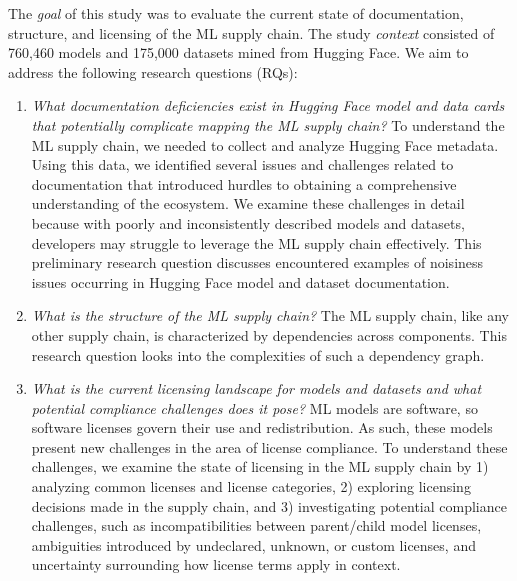 \label{sec:methodology}

The \emph{goal} of this study was to evaluate the current state of documentation, structure, and licensing of the ML supply chain. The study \emph{context} consisted of 760,460 models and 175,000 datasets mined from Hugging Face. We aim to address the following research questions (RQs):

\begin{enumerate}[label=\textbf{RQ$_\arabic*$:}, ref=\textbf{RQ$_\arabic*$}, wide, labelindent=10pt,leftmargin=10pt, start=0]\setlength{\itemsep}{0.2em} 

    \item \label{rq:2}{\textit{What documentation deficiencies exist in Hugging Face model and data cards that potentially complicate mapping the ML supply chain?}} %
    To understand the ML supply chain, we needed to collect and analyze Hugging Face metadata. Using this data, we identified several issues and challenges related to documentation that introduced hurdles to obtaining a comprehensive understanding of the ecosystem. We examine these challenges in detail because with poorly and inconsistently described models and datasets, developers may struggle to leverage the ML supply chain effectively. This preliminary research question discusses encountered examples of noisiness issues occurring in Hugging Face model and dataset documentation.
  
    \item \label{rq:1}{\textit{What is the structure of the ML supply chain?}} The ML supply chain, like any other supply chain, is characterized by dependencies across components. This research question looks into the complexities of such a dependency graph.%
  
    \item \label{rq:3}{\textit{What is the current licensing landscape for models and datasets and what potential compliance challenges does it pose?}}  ML models are software, so software licenses govern their use and redistribution. %
    As such, these models present new challenges in the area of license compliance. To understand these challenges, we examine the state of licensing in the ML supply chain by 1) analyzing common licenses and license categories, 2) exploring licensing decisions made in the supply chain, %
    and 3) investigating potential compliance challenges, such as incompatibilities between parent/child model licenses, ambiguities introduced by undeclared, unknown, or custom licenses, and uncertainty surrounding how license terms apply in context.  %
\end{enumerate}

